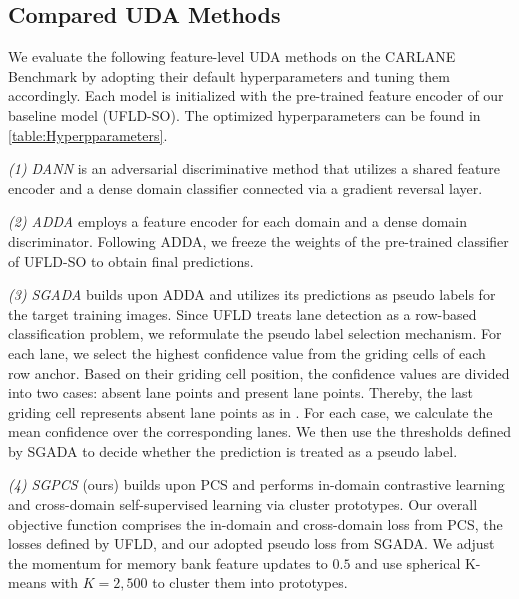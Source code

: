 \documentclass{article}
\begin{document}
	\subsection{Compared UDA Methods}
	We evaluate the following feature-level UDA methods on the CARLANE Benchmark by adopting their default hyperparameters and tuning them accordingly. Each model is initialized with the pre-trained feature encoder of our baseline model (UFLD-SO). The optimized hyperparameters can be found in \autoref{table:Hyperpparameters}. \vspace{-2pt}
	
	\textit{(1) DANN} \cite{Ganin2016} is an adversarial discriminative method that utilizes a shared feature encoder and a dense domain classifier connected via a gradient reversal layer.
	\vspace{-2pt}
	
	\textit{(2) ADDA} \cite{Tzeng2017ADDA} employs a feature encoder for each domain and a dense domain discriminator. Following ADDA, we freeze the weights of the pre-trained classifier of UFLD-SO to obtain final predictions.
	
	\textit{(3) SGADA} \cite{sgada2021} builds upon ADDA and utilizes its predictions as pseudo labels for the target training images. Since UFLD treats lane detection as a row-based classification problem, we reformulate the pseudo label selection mechanism. For each lane, we select the highest confidence value from the griding cells of each row anchor. Based on their griding cell position, the confidence values are divided into two cases: absent lane points and present lane points. Thereby, the last griding cell represents absent lane points as in \cite{qin2020ultra}. For each case, we calculate the mean confidence over the corresponding lanes. We then use the thresholds defined by SGADA
	to decide whether the prediction is treated as a pseudo label.
	
	\textit{(4) SGPCS} (ours) builds upon PCS \cite{yue2021prototypical} and performs in-domain contrastive learning and cross-domain self-supervised learning via cluster prototypes. Our overall objective function comprises the in-domain and cross-domain loss from PCS, the losses defined by UFLD, and our adopted pseudo loss from SGADA. We adjust the momentum for memory bank feature updates to $0.5$ and use spherical K-means \cite{johnson2019billion} with $K=2,500$ to cluster them into prototypes.
	
\end{document}
